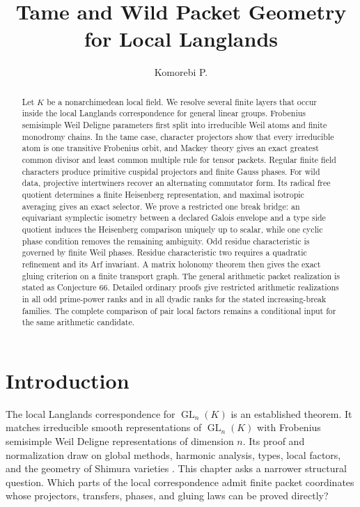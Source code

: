 \documentclass[11pt]{amsart}
\title[Tame and wild packet geometry]{Tame and Wild Packet Geometry for Local Langlands}
\author[Komorebi P.]{Komorebi P.}
\date{}
\theoremstyle{definition}
\theoremstyle{remark}
\newcommand{\GL}{\operatorname{GL}}
\begin{document}
\KomorebiCover

\begin{abstract}
Let \(K\) be a nonarchimedean local field. We resolve several finite layers that occur inside the local Langlands correspondence for general linear groups. Frobenius semisimple Weil Deligne parameters first split into irreducible Weil atoms and finite monodromy chains. In the tame case, character projectors show that every irreducible atom is one transitive Frobenius orbit, and Mackey theory gives an exact greatest common divisor and least common multiple rule for tensor packets. Regular finite field characters produce primitive cuspidal projectors and finite Gauss phases. For wild data, projective intertwiners recover an alternating commutator form. Its radical free quotient determines a finite Heisenberg representation, and maximal isotropic averaging gives an exact selector. We prove a restricted one break bridge: an equivariant symplectic isometry between a declared Galois envelope and a type side quotient induces the Heisenberg comparison uniquely up to scalar, while one cyclic phase condition removes the remaining ambiguity. Odd residue characteristic is governed by finite Weil phases. Residue characteristic two requires a quadratic refinement and its Arf invariant. A matrix holonomy theorem then gives the exact gluing criterion on a finite transport graph. The general arithmetic packet realization is stated as Conjecture 66. Detailed ordinary proofs give restricted arithmetic realizations in all odd prime-power ranks and in all dyadic ranks for the stated increasing-break families. The complete comparison of pair local factors remains a conditional input for the same arithmetic candidate.
\end{abstract}
\makeatletter\@setabstract\makeatother
\thispagestyle{plain}
\clearpage
\setcounter{tocdepth}{1}
\begingroup\setlength{\parskip}{0pt}
\tableofcontents
\endgroup
\clearpage

\clearpage

\section{Introduction}\label{sec:introduction}

The local Langlands correspondence for \(\GL_n(K)\) is an established theorem. It matches irreducible smooth representations of \(\GL_n(K)\) with Frobenius semisimple Weil Deligne representations of dimension \(n\). Its proof and normalization draw on global methods, harmonic analysis, types, local factors, and the geometry of Shimura varieties \cite{Henniart2000,HarrisTaylor2001,BushnellHenniart2006}. This chapter asks a narrower structural question. Which parts of the local correspondence admit finite packet coordinates whose projectors, transfers, phases, and gluing laws can be proved directly?
\end{document}
